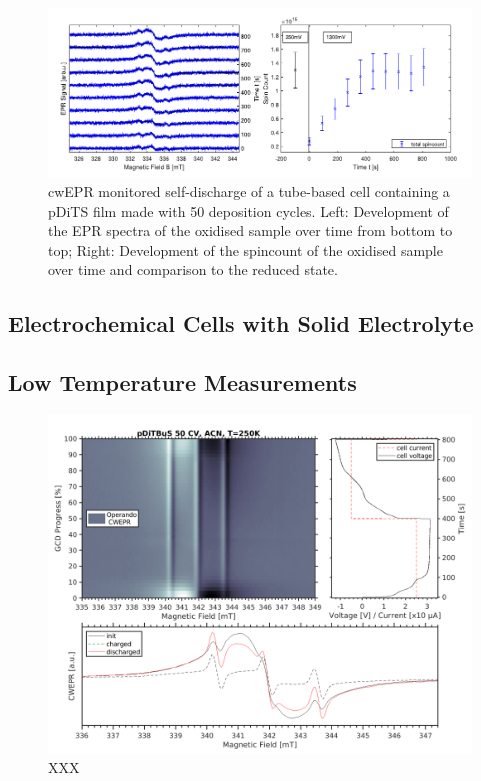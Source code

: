 \begin{figure}[h]
\center
	\includegraphics[width=1\textwidth]{./operando_epr/figures/self_discharge/DOM_DITS_SELF_DISCHARGE.pdf}
	\caption{cwEPR monitored self-discharge of a tube-based cell containing a pDiTS film made with 50 deposition cycles. Left: Development of the EPR spectra of the oxidised sample over time from bottom to top; Right: Development of the spincount of the oxidised sample over time and comparison to the reduced state.~\cite{DOM}}
	\label{fig:self_discharge_DOM}
\end{figure}




\subsection{Electrochemical Cells with Solid Electrolyte}





\subsection{Low Temperature Measurements}
\begin{figure}[h]
\center
	\includegraphics[width=1\textwidth]{./operando_epr/figures/slowcharge_231117_liquid_250K.pdf}
	\caption{XXX}
	\label{fig:operando_cold_cycle}
\end{figure}

